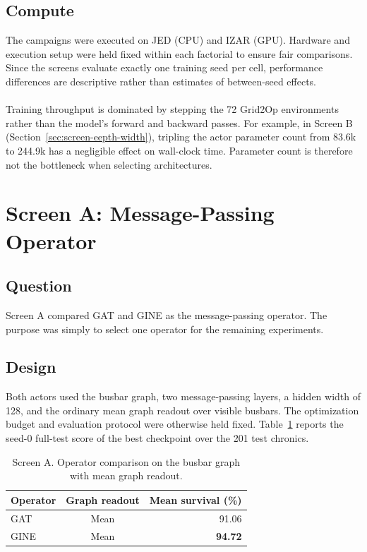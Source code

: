 \subsection{Compute}
\label{subsec:screening-budget-alignment}

The campaigns were executed on JED (CPU) and IZAR (GPU). Hardware and execution setup were held fixed within each factorial to ensure fair comparisons. Since the screens evaluate exactly one training seed per cell, performance differences are descriptive rather than estimates of between-seed effects.
\\
\\
Training throughput is dominated by stepping the 72 Grid2Op environments rather than the model's forward and backward passes. For example, in Screen B (Section~\ref{sec:screen-eepth-width}), tripling the actor parameter count from 83.6k to 244.9k has a negligible effect on wall-clock time. Parameter count is therefore not the bottleneck when selecting architectures.

\section{\texorpdfstring{Screen A: Message-Passing Operator}{Screen A: Message-Passing Operator}}
\label{sec:preliminary-gine-gat-screen}

\subsection*{Question}

Screen A compared GAT
and GINE as the message-passing operator. The purpose was simply to select one
operator for the remaining experiments.

\subsection*{Design}

Both actors used the busbar graph, two message-passing layers,
a hidden width of 128, and the ordinary mean graph readout over visible
busbars. The optimization budget and evaluation protocol were otherwise held
fixed. Table~\ref{tab:preliminary-gine-gat} reports the seed-0 full-test score
of the best checkpoint over the 201 test chronics.

\begin{table}[H]
  \centering
  \small
  \caption{Screen A. Operator comparison on the busbar graph
  with mean graph readout.}
  \label{tab:preliminary-gine-gat}
  \setlength{\tabcolsep}{7pt}
  \begin{tabular}{lcr}
    \toprule
    Operator & Graph readout & Mean survival (\%) \\
    \midrule
    GAT  & Mean & 91.06 \\
    GINE & Mean & \textbf{94.72} \\
    \bottomrule
  \end{tabular}
\end{table}

